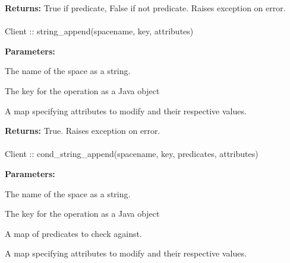\noindent\textbf{Returns:}
True if predicate, False if not predicate.  Raises exception on error.

\paragraph{}
\label{api:java:string_append}
\begin{javacode}
Client :: string_append(spacename, key, attributes)
\end{javacode}


\noindent\textbf{Parameters:}
\begin{description}[labelindent=\widthof{{\code{attributes}}},leftmargin=*,noitemsep,nolistsep,align=right]
\item[\code{spacename}] The name of the space as a string.
\item[\code{key}] The key for the operation as a Java object
\item[\code{attributes}] A map specifying attributes to modify and their respective values.
\end{description}

\noindent\textbf{Returns:}
True.  Raises exception on error.

\paragraph{}
\label{api:java:cond_string_append}
\begin{javacode}
Client :: cond_string_append(spacename, key, predicates, attributes)
\end{javacode}


\noindent\textbf{Parameters:}
\begin{description}[labelindent=\widthof{{\code{predicates}}},leftmargin=*,noitemsep,nolistsep,align=right]
\item[\code{spacename}] The name of the space as a string.
\item[\code{key}] The key for the operation as a Java object
\item[\code{predicates}] A map of predicates to check against.
\item[\code{attributes}] A map specifying attributes to modify and their respective values.
\end{description}

